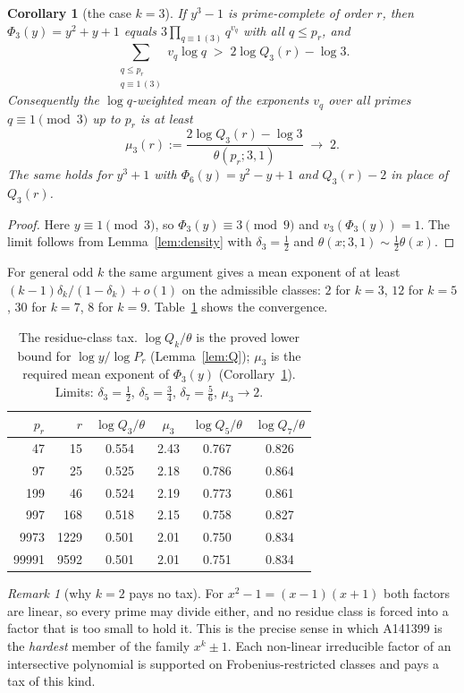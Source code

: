 \documentclass[11pt]{article}
\newtheorem{corollary}[theorem]{Corollary}
\theoremstyle{definition}
\theoremstyle{remark}
\newtheorem{remark}[theorem]{Remark}
\begin{document}
\begin{corollary}[the case $k=3$]\label{cor:k3}
If $y^3-1$ is prime-complete of order $r$, then $\Phi_3(y)=y^2+y+1$ equals
$3\prod_{q\equiv1\,(3)}q^{v_q}$ with all $q\le p_r$, and
\[
\sum_{\substack{q\le p_r\\ q\equiv1\,(3)}}v_q\log q\;>\;2\log Q_3(r)-\log 3 .
\]
Consequently the $\log q$-weighted mean of the exponents $v_q$ over all primes
$q\equiv1\pmod3$ up to $p_r$ is at least
\[
\mu_3(r):=\frac{2\log Q_3(r)-\log3}{\theta(p_r;3,1)}\;\longrightarrow\;2 .
\]
The same holds for $y^3+1$ with $\Phi_6(y)=y^2-y+1$ and $Q_3(r)-2$ in place
of $Q_3(r)$.
\end{corollary}
\begin{proof}
Here $y\equiv1\pmod3$, so $\Phi_3(y)\equiv3\pmod9$ and $v_3(\Phi_3(y))=1$.
The limit follows from Lemma~\ref{lem:density} with $\delta_3=\tfrac12$ and
$\theta(x;3,1)\sim\tfrac12\theta(x)$.
\end{proof}

For general odd $k$ the same argument gives a mean exponent of at least
$(k-1)\delta_k/(1-\delta_k)+o(1)$ on the admissible classes: $2$ for $k=3$,
$12$ for $k=5$, $30$ for $k=7$, $8$ for $k=9$. Table~\ref{tab:tax} shows the
convergence.

\begin{table}[ht]
\centering
\caption{The residue-class tax. $\log Q_k/\theta$ is the proved lower bound for
$\log y/\log P_r$ (Lemma~\ref{lem:Q}); $\mu_3$ is the required mean exponent of
$\Phi_3(y)$ (Corollary~\ref{cor:k3}). Limits: $\delta_3=\tfrac12$,
$\delta_5=\tfrac34$, $\delta_7=\tfrac56$, $\mu_3\to2$.}
\label{tab:tax}
\begin{tabular}{rrcccc}
\toprule
$p_r$ & $r$ & $\log Q_3/\theta$ & $\mu_3$ & $\log Q_5/\theta$ & $\log Q_7/\theta$\\
\midrule
47 & 15 & 0.554 & 2.43 & 0.767 & 0.826\\
97 & 25 & 0.525 & 2.18 & 0.786 & 0.864\\
199 & 46 & 0.524 & 2.19 & 0.773 & 0.861\\
997 & 168 & 0.518 & 2.15 & 0.758 & 0.827\\
9973 & 1229 & 0.501 & 2.01 & 0.750 & 0.834\\
99991 & 9592 & 0.501 & 2.01 & 0.751 & 0.834\\
\bottomrule
\end{tabular}
\end{table}

\begin{remark}[why $k=2$ pays no tax]
For $x^2-1=(x-1)(x+1)$ both factors are linear, so every prime may divide
either, and no residue class is forced into a factor that is too small to hold
it. This is the precise sense in which A141399 is the \emph{hardest} member of
the family $x^k\pm1$. Each non-linear irreducible factor of an intersective
polynomial is supported on Frobenius-restricted classes and pays a tax of this
kind.
\end{remark}
\end{document}
